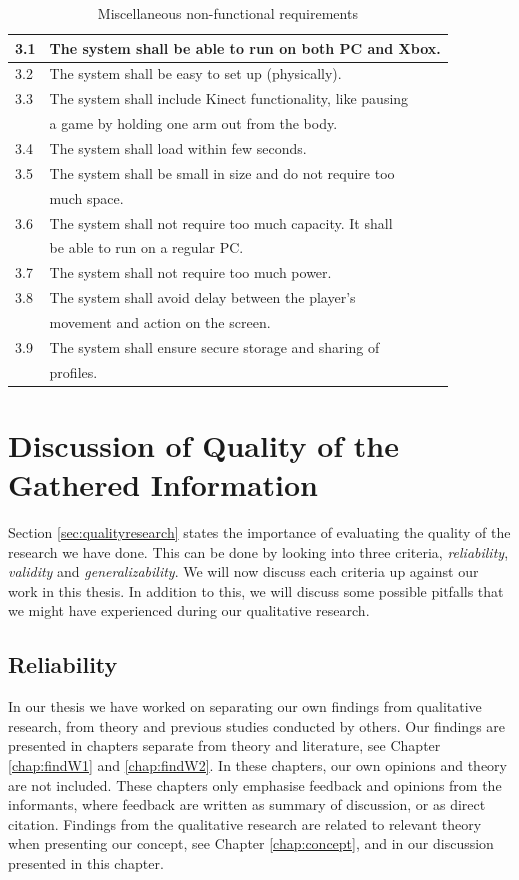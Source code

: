 \begin{table} [H]
\label{tab:nfunc2}
\centering
\begin{tabular}{|l|l|}
\hline
3.1 & The system shall be able to run on both PC and Xbox. \\ \hline
3.2 & The system shall be easy to set up (physically).\\ \hline
3.3 & The system shall include Kinect functionality, like pausing \\ & a game by holding one arm out from the body. \\ \hline
3.4 & The system shall load within few seconds.\\ \hline
3.5 & The system shall be small in size and do not require too \\&  much space.\\ \hline
3.6 & The system shall not require too much capacity. It shall \\ & be able to run on a regular PC. \\ \hline
3.7 & The system shall not require too much power. \\ \hline
3.8 & The system shall avoid delay between the player's \\ & movement and action on the screen.\\ \hline
3.9 & The system shall ensure secure storage and sharing of \\ & profiles. \\ \hline
\end{tabular}
\caption[Miscellaneous non-functional requirements]{Miscellaneous non-functional requirements}
\end{table} 

\section{Discussion of Quality of the Gathered Information}
\label{sec:discQuality}

Section \ref{sec:qualityresearch} states the importance of evaluating the quality of the research we have done. This can be done by looking into three criteria, \emph{reliability}, \emph{validity} and \emph{generalizability}. We will now discuss each criteria up against our work in this thesis. In addition to this, we will discuss some possible pitfalls that we might have experienced during our qualitative research.  

\subsection{Reliability}
In our thesis we have worked on separating our own findings from qualitative research, from theory and previous studies conducted by others. Our findings are presented in chapters separate from theory and literature, see Chapter \ref{chap:findW1} and \ref{chap:findW2}. In these chapters, our own opinions and theory are not included. These chapters only emphasise feedback and opinions from the informants, where feedback are written as summary of discussion, or as direct citation. Findings from the qualitative research are related to relevant theory when presenting our concept, see Chapter \ref{chap:concept}, and in our discussion presented in this chapter.

